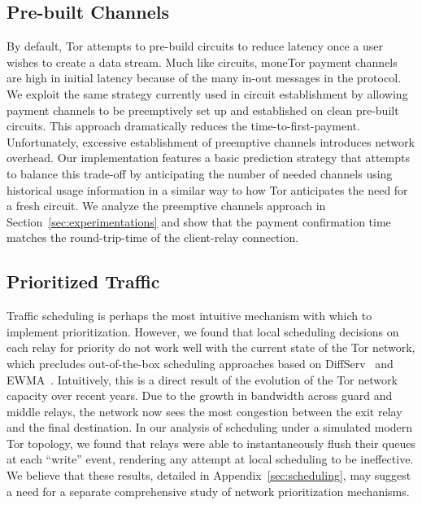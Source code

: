 \subsection{Pre-built Channels} By default, Tor attempts to pre-build circuits to reduce latency once a user wishes to create a data stream.
Much like circuits, moneTor payment channels are high in initial latency because of the many in-out messages in the protocol.
We exploit the same strategy currently used in circuit establishment by allowing payment channels to be preemptively set up and established on clean pre-built circuits.
This approach dramatically reduces the time-to-first-payment.
Unfortunately, excessive establishment of preemptive channels introduces network overhead.
Our implementation features a basic prediction strategy that attempts to balance this trade-off by anticipating the number of needed channels using historical usage information in a similar way to how Tor anticipates the need for a fresh circuit.
We analyze the preemptive channels approach in Section~\ref{sec:experimentations} and show that the payment confirmation time matches the round-trip-time of the client-relay connection.

\subsection{Prioritized Traffic}
\label{subsub:prioritized}

Traffic scheduling is perhaps the most intuitive mechanism with which to implement prioritization.
However, we found that local scheduling decisions on each relay for priority do not work well with the current state of the Tor network, which precludes out-of-the-box scheduling approaches based on DiffServ~\cite{dovrolis1999case} and EWMA~\cite{tang2010improved}.
Intuitively, this is a direct result of the evolution of the Tor network capacity over recent years.
Due to the growth in bandwidth across guard and middle relays, the network now sees the most congestion between the exit relay and the final destination.
In our analysis of scheduling under a simulated modern Tor topology, we found that relays were able to instantaneously flush their queues at each ``write'' event, rendering any attempt at local scheduling to be ineffective.
We believe that these results, detailed in Appendix~\ref{sec:scheduling}, may suggest a need for a separate comprehensive study of network prioritization mechanisms.

